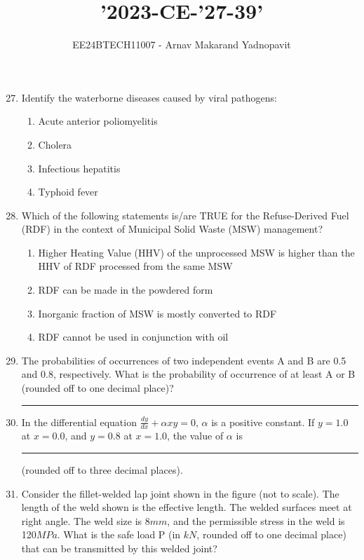 \documentclass[journal,12pt,onecolumn]{IEEEtran}
\theoremstyle{remark}
\begin{document}
\title{'2023-CE-'27-39'}
\author{EE24BTECH11007 - Arnav Makarand Yadnopavit}
\maketitle
\renewcommand{\thefigure}{\theenumi}
\renewcommand{\thetable}{\theenumi}
\begin{enumerate}
\setcounter{enumi}{26}
\item Identify the waterborne diseases caused by viral pathogens:
\begin{enumerate}
\item Acute anterior poliomyelitis
\item Cholera
\item Infectious hepatitis
\item Typhoid fever
\end{enumerate}
\item Which of the following statements is/are TRUE for the Refuse-Derived Fuel (RDF) in the context of Municipal Solid Waste (MSW) management?
\begin{enumerate}
\item Higher Heating Value (HHV) of the unprocessed MSW is higher than the HHV of RDF processed from the same MSW
\item RDF can be made in the powdered form
\item Inorganic fraction of MSW is mostly converted to RDF
\item RDF cannot be used in conjunction with oil
\end{enumerate}
\item  The probabilities of occurrences of two independent events A and B are 0.5 and 0.8, respectively. What is the probability of occurrence of at least A or B (rounded off to one decimal place)?\rule{2cm}{0.15mm}
\item In the differential equation $\frac{dy}{dx}+\alpha xy=0$, $\alpha$ is a positive constant. If $y=1.0$ at $x=0.0$, and $y=0.8$ at $x=1.0$, the value of $\alpha$ is \rule{2cm}{0.15mm}(rounded off to three decimal places).
\item Consider the fillet-welded lap joint shown in the figure (not to scale). The length of the weld shown is the effective length. The welded surfaces meet at right angle. The weld size is 8$mm$, and the permissible stress in the weld is 120$MPa$. What is the safe load P (in $kN$, rounded off to one decimal place) that can be transmitted by this welded joint?
\begin{figure}[H]

\end{figure}
\end{enumerate}
\end{document}
